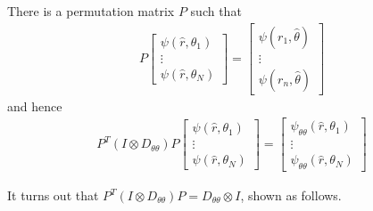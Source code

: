 There is a permutation matrix $P$ such that
\begin{align*}
 P
 \begin{bmatrix}
  \psi(\hat{r},\theta_1)\\ \vdots \\ \psi(\hat{r},\theta_N)
 \end{bmatrix}
 =
 \begin{bmatrix}
  \psi(r_1,\hat{\theta}) \\
  \vdots \\
  \psi(r_n,\hat{\theta})
 \end{bmatrix}
\end{align*}
and hence
\begin{align*}
 P^T (I \otimes D_{\theta\theta}) P
 \begin{bmatrix}
  \psi(\hat{r},\theta_1) \\ \vdots \\ \psi(\hat{r},\theta_N)
 \end{bmatrix}
 =
 \begin{bmatrix}
  \psi_{\theta\theta}(\hat{r},\theta_1) \\
  \vdots \\
  \psi_{\theta\theta}(\hat{r},\theta_N)
 \end{bmatrix}
\end{align*}

It turns out that $P^T (I \otimes D_{\theta\theta}) P
 = D_{\theta\theta} \otimes I$, shown as follows.

